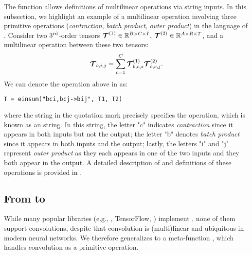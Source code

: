 The \einsum function allows definitions of multilinear operations via string inputs. In this subsection, we highlight an example of a multilinear operation involving three primitive operations ({\em contraction}, {\em batch product}, {\em outer product}) in the language of \einsum.
Consider two $3^{\mathrm{rd}}$-order tensors $\bm{\mathcal{T}}^{(1)} \in \mathbb{R}^{B \times C \times I}$, $\bm{\mathcal{T}}^{(2)} \in \mathbb{R}^{A \times R \times T}$, and a multilinear operation between these two tensors:
\begingroup
\abovedisplayskip=5pt
\belowdisplayskip=5pt
\begin{equation}
\label{eq:multi-operation}
\bm{\mathcal{T}}_{b,i,j} = \sum_{c = 1}^{C}
\bm{\mathcal{T}}^{(1)}_{b,c,s} \bm{\mathcal{T}}^{(2)}_{b,c,j}.
\end{equation}
\endgroup
We can denote the operation above in \einsum as:
\begin{lstlisting}
T = einsum("bci,bcj->bij", T1, T2)
\end{lstlisting}
\vspace{-1em}
where the string in the quotation mark precisely specifies the operation, which is known as an \einsum string. In this string, the letter \textsf{"c"} indicates {\em contraction} since it appears in both inputs but not the output; the letter \textsf{"b"} denotes {\em batch product} since it appears in both inputs and the output; lastly, the letters \textsf{"i"} and \textsf{"j"} represent {\em outer product} as they each appears in one of the two inputs and they both appear in the output. %
A detailed description of \einsum and definitions of these operations is provided in .

\subsection{From \einsum to \conveinsum}
\label{sub:einsum}
While many popular libraries (e.g., \numpy, \textsf{TensorFlow}, \pytorch) implement \einsum, none of them support convolutions, despite that convolution is (multi)linear and ubiquitous in modern neural networks.
We therefore generalizes \einsum to a meta-function \conveinsum, 
which handles convolution as a primitive operation.

